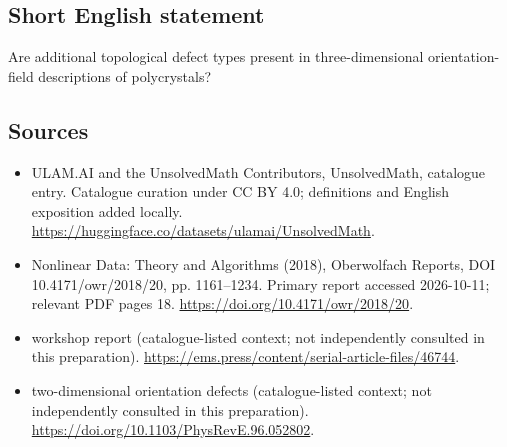 \documentclass[11pt]{article}
\begin{document}
\subsection{Short English statement}
Are additional topological defect types present in three-dimensional orientation-field descriptions of polycrystals?
\subsection{Sources}
\begin{itemize}
\item[\hypertarget{source:statement:1}{S1}] ULAM.AI and the UnsolvedMath Contributors, UnsolvedMath, catalogue entry. Catalogue curation under CC BY 4.0; definitions and English exposition added locally.
\url{https://huggingface.co/datasets/ulamai/UnsolvedMath}.
\item[\hypertarget{source:statement:2}{S2}] Nonlinear Data: Theory and Algorithms (2018), Oberwolfach Reports, DOI 10.4171/owr/2018/20, pp. 1161--1234. Primary report accessed 2026-10-11; relevant PDF pages 18.
\url{https://doi.org/10.4171/owr/2018/20}.
\item[\hypertarget{source:statement:3}{S3}] workshop report (catalogue-listed context; not independently consulted in this preparation).
\url{https://ems.press/content/serial-article-files/46744}.
\item[\hypertarget{source:statement:4}{S4}] two-dimensional orientation defects (catalogue-listed context; not independently consulted in this preparation).
\url{https://doi.org/10.1103/PhysRevE.96.052802}.
\end{itemize}
\label{end:statement}
\end{document}

